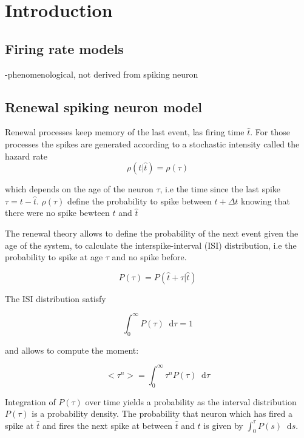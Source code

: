 \documentclass{report}
\newcommand{\dd}{
	\mathop{}\mathopen{}\mathrm{d}
}
\begin{document}
\chapter{Introduction}
\label{chap:intro}

\section{Firing rate models}

-phenomenological, not derived from spiking neuron \cite{DayAbb05}

\section{Renewal spiking neuron model}
\label{sec:renew}

Renewal processes keep memory of the last event, las firing time $\hat{t}$. For those processes the spikes are generated according to a stochastic intensity called the hazard rate
\begin{equation}
  \label{eq:rho1}
\rho(t|\hat{t})=\rho(\tau)
\end{equation}

which depends on the age of the neuron $\tau$, i.e the time since the last spike $\tau=t-\hat{t}$. $\rho(\tau)$ define the probability to spike between $t+\Delta t$ knowing that there were no spike bewteen $t$ and $\hat{t}$

The renewal theory allows to define the probability of the next event given the age of the system, to calculate the interspike-interval (ISI) distribution, i.e the probability to spike at age $\tau$ and no spike before.

\begin{equation}
  \label{eq:P1}
P(\tau)=P(\hat{t}+\tau| \hat{t})
\end{equation}

The ISI distribution satisfy

\begin{equation}
  \label{eq:Pnorm}
\int_0^\infty P(\tau)\dd\tau=1 
\end{equation}

and allows to compute the moment:


\begin{equation}
  \label{eq:Pmoment}
<\tau^n>=\int_0^\infty \tau^nP(\tau)\dd\tau
\end{equation}

Integration of $P(\tau)$ over time yields a probability as the interval distribution $P(\tau)$ is a probability density. The probability that neuron which has fired a spike at $\hat{t}$ and fires the next spike at between $\hat{t}$ and $t$ is given by $\int_0^\tau P(s) \dd s$.
\end{document}
